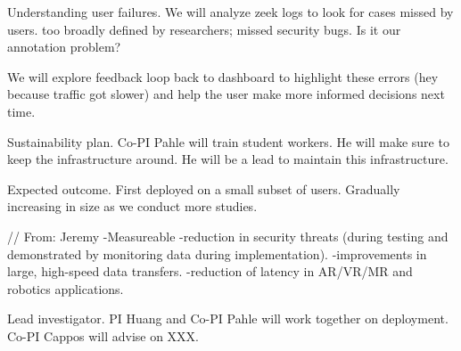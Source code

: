 Understanding user failures. We will analyze zeek logs to look for cases missed by users. too broadly defined by researchers; missed security bugs.  Is it our annotation problem?

We will explore feedback loop back to dashboard to highlight these errors (hey because traffic got slower) and help the user make more informed decisions next time.

Sustainability plan. Co-PI Pahle will train student workers. He will make sure to keep the infrastructure around. He will be a lead to maintain this infrastructure.

Expected outcome. First deployed on a small subset of users. Gradually increasing in size as we conduct more studies.

// From: Jeremy
	-Measureable
-reduction in security threats (during testing and demonstrated by monitoring
data during implementation).
	-improvements in large, high-speed data transfers.
	-reduction of latency in AR/VR/MR and robotics applications.


Lead investigator. PI Huang and Co-PI Pahle will work together on deployment. Co-PI Cappos will advise on XXX.
